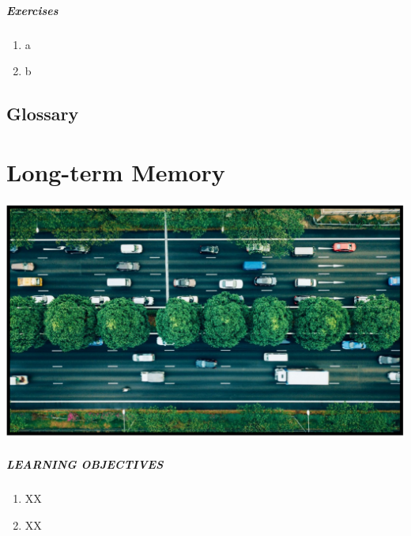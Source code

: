 \documentclass[
]{krantz}
\providecommand{\tightlist}{%
  \setlength{\itemsep}{0pt}\setlength{\parskip}{0pt}}
\begin{document}
\hypertarget{exercises-3}{%
\paragraph*{Exercises}\label{exercises-3}}

\begin{enumerate}
\def\labelenumi{\arabic{enumi}.}
\tightlist
\item
  a
\item
  b
\end{enumerate}

\hypertarget{glossary-3}{%
\section{Glossary}\label{glossary-3}}

\hypertarget{long-term-memory}{%
\chapter{Long-term Memory}\label{long-term-memory}}

\begin{center}\includegraphics[width=1\linewidth]{images/ch5/fig0} \end{center}

\hypertarget{learning-objectives-4}{%
\paragraph*{LEARNING OBJECTIVES}\label{learning-objectives-4}}

\begin{enumerate}
\def\labelenumi{\arabic{enumi}.}
\tightlist
\item
  XX
\item
  XX
\end{enumerate}
\end{document}
